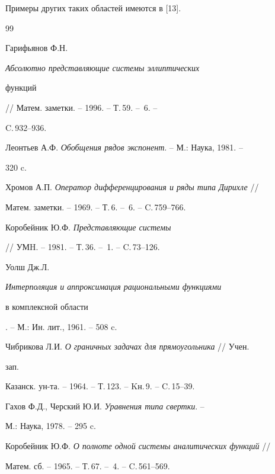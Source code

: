 Примеры других таких областей имеются в [13].  


 


 


\begin{thebibliography}{99} 


 




Гарифьянов Ф.Н. {\em Абсолютно представляющие системы эллиптических  


функций} // Матем. заметки. -- 1996. -- Т.\,59. -- \No\,6. -- 


C.\,932--936. 




Леонтьев А.Ф. {\em Обобщения рядов экспонент}. -- М.: Наука, 1981. -- 


320 c. 




Хромов А.П. {\em Оператор дифференцирования и ряды типа Дирихле} //  


Матем. заметки. -- 1969. -- Т.\,6. -- \No\,6. -- C.\,759--766. 




Коробейник Ю.Ф. {\em Представляющие системы} 


// УМH. -- 1981. -- Т.\,36. -- \No\,1. -- C.\,73--126. 




Уолш Дж.Л. {\em Интерполяция и аппроксимация рациональными функциями  


в комплексной области}. -- М.: Ин. лит., 1961. -- 508 c. 




Чибрикова Л.И. {\em О граничных задачах для прямоугольника} // Учен. 


зап.  


Казанск. ун-та. -- 1964. -- Т.\,123. -- Kн.\,9. -- C.\,15--39. 




Гахов Ф.Д., Черский Ю.И. {\em Уравнения типа свертки}. -- 


М.: Наука, 1978. -- 295 c. 




Коробейник Ю.Ф. {\em О полноте одной системы аналитических функций} //  


Матем. сб. -- 1965. -- Т.\,67. -- \No\,4. -- C.\,561--569.  





\end{thebibliography}
